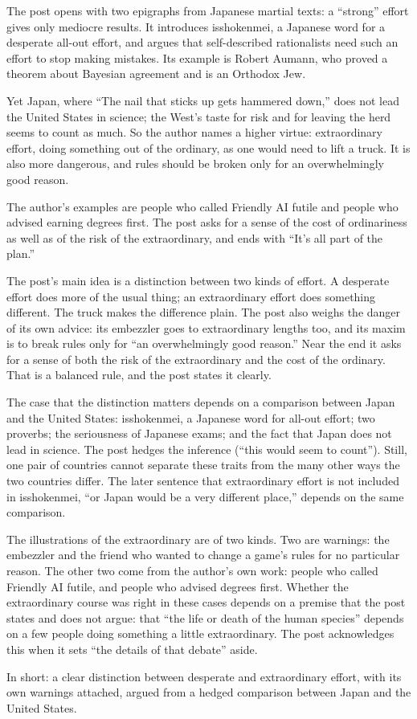 \begin{afterword}
\summaryhead

The post opens with two epigraphs from Japanese martial texts: a ``strong'' effort gives only mediocre results. It introduces isshokenmei, a Japanese word for a desperate all-out effort, and argues that self-described rationalists need such an effort to stop making mistakes. Its example is Robert Aumann, who proved a theorem about Bayesian agreement and is an Orthodox Jew.

Yet Japan, where ``The nail that sticks up gets hammered down,'' does not lead the United States in science; the West's taste for risk and for leaving the herd seems to count as much. So the author names a higher virtue: extraordinary effort, doing something out of the ordinary, as one would need to lift a truck. It is also more dangerous, and rules should be broken only for an overwhelmingly good reason.

The author's examples are people who called Friendly AI futile and people who advised earning degrees first. The post asks for a sense of the cost of ordinariness as well as of the risk of the extraordinary, and ends with ``It's all part of the plan.''

\responsehead

The post's main idea is a distinction between two kinds of effort. A desperate effort does more of the usual thing; an extraordinary effort does something different. The truck makes the difference plain. The post also weighs the danger of its own advice: its embezzler goes to extraordinary lengths too, and its maxim is to break rules only for ``an overwhelmingly good reason.'' Near the end it asks for a sense of both the risk of the extraordinary and the cost of the ordinary. That is a balanced rule, and the post states it clearly.

The case that the distinction matters depends on a comparison between Japan and the United States: isshokenmei, a Japanese word for all-out effort; two proverbs; the seriousness of Japanese exams; and the fact that Japan does not lead in science. The post hedges the inference (``this would seem to count''). Still, one pair of countries cannot separate these traits from the many other ways the two countries differ. The later sentence that extraordinary effort is not included in isshokenmei, ``or Japan would be a very different place,'' depends on the same comparison.

The illustrations of the extraordinary are of two kinds. Two are warnings: the embezzler and the friend who wanted to change a game's rules for no particular reason. The other two come from the author's own work: people who called Friendly AI futile, and people who advised degrees first. Whether the extraordinary course was right in these cases depends on a premise that the post states and does not argue: that ``the life or death of the human species'' depends on a few people doing something a little extraordinary. The post acknowledges this when it sets ``the details of that debate'' aside.

In short: a clear distinction between desperate and extraordinary effort, with its own warnings attached, argued from a hedged comparison between Japan and the United States.
\end{afterword}
